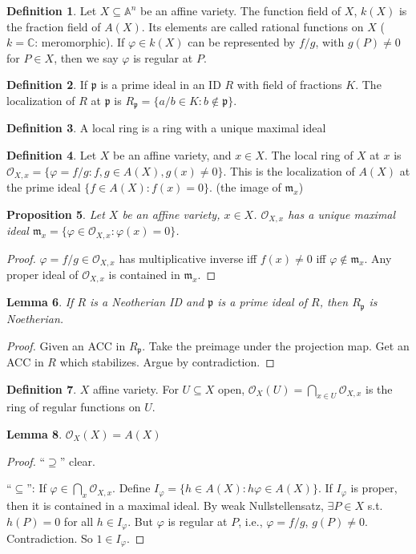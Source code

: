 \documentclass{article}
\theoremstyle{definition}
\newtheorem{defn}{Definition}[section]
\theoremstyle{remark}
\theoremstyle{plain}
\newtheorem{lem}[defn]{Lemma}
\newtheorem{prop}[defn]{Proposition}
\newcommand{\CC}{\mathbb{C}}
\newcommand{\bA}{\mathbb{A}}
\begin{document}
\begin{defn}
    Let $X\subseteq\bA^n$ be an affine variety. The function field of $X$, $k(X)$ is the fraction field of $A(X)$. Its elements are called rational functions on $X$ ($k=\CC$: meromorphic). If $\varphi\in k(X)$ can be represented by $f/g$, with $g(P)\neq 0$ for $P\in X$, then we say $\varphi$ is regular at $P$.
\end{defn}
\begin{defn}
    If $\mathfrak p$ is a prime ideal in an ID $R$ with field of fractions $K$. The localization of $R$ at $\mathfrak p$ is $R_{\mathfrak p}=\{a/b\in K:b\not\in\mathfrak p\}$.
\end{defn}
\begin{defn}
    A local ring is a ring with a unique maximal ideal
\end{defn}
\begin{defn}
    Let $X$ be an affine variety, and $x\in X$. The local ring of $X$ at $x$ is $\mathcal O_{X,x}=\{\varphi=f/g: f,g\in A(X), g(x)\neq 0\}$. This is the localization of $A(X)$ at the prime ideal $\{f\in A(X):f(x)=0\}$. (the image of $\mathfrak m_x$)
\end{defn}
\begin{prop}
    Let $X$ be an affine variety, $x\in X$. $\mathcal O_{X,x}$ has a unique maximal ideal $\mathfrak m_{x}=\{\varphi\in\mathcal O_{X,x}:\varphi(x)=0\}$.
\end{prop}
\begin{proof}
    $\varphi=f/g\in \mathcal O_{X,x}$ has multiplicative inverse iff $f(x)\neq 0$ iff $\varphi\not\in\mathfrak m_x$. Any proper ideal of $\mathcal O_{X,x}$ is contained in $\mathfrak m_x$. 
\end{proof}
\begin{lem}
    If $R$ is a Neotherian ID and $\mathfrak p$ is a prime ideal of $R$, then $R_{\mathfrak p}$ is Noetherian.
\end{lem}
\begin{proof}
    Given an ACC in $R_{\mathfrak p}$. Take the preimage under the projection map. Get an ACC in $R$ which stabilizes. Argue by contradiction.
\end{proof}
\begin{defn}
    $X$ affine variety. For $U\subseteq X$ open, $\mathcal O_X(U)=\bigcap_{x\in U}\mathcal O_{X,x}$ is the ring of regular functions on $U$.
\end{defn}
\begin{lem}
    $\mathcal O_X(X)=A(X)$
\end{lem}
\begin{proof}
    ``$\supseteq$'' clear.

    ``$\subseteq$'': If $\varphi\in\bigcap_x\mathcal O_{X,x}$. Define $I_{\varphi}=\{h\in A(X):h\varphi\in A(X)\}$. If $I_\varphi$ is proper, then it is contained in a maximal ideal. By weak Nullstellensatz, $\exists P\in X$ s.t. $h(P)=0$ for all $h\in I_{\varphi}$. But $\varphi$ is regular at $P$, i.e., $\varphi=f/g$, $g(P)\neq 0$. Contradiction. So $1\in I_\varphi$.
\end{proof}
\end{document}
